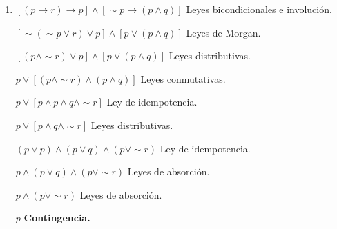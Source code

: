 \documentclass[12pt]{article}
\begin{document}
\begin{enumerate}[start=5]
            \item {\large $[(p \longrightarrow r) \longrightarrow p] \wedge [\sim p \longrightarrow (p \wedge q)]$} {\footnotesize Leyes bicondicionales e involución.}
                \par$[\sim (\sim p \vee r) \vee p] \wedge [ p \vee (p \wedge q)]$ {\footnotesize Leyes de Morgan.}
                \par$[( p \wedge \sim r) \vee p] \wedge [ p \vee (p \wedge q)]$ {\footnotesize Leyes distributivas.}
                \par$p \vee [(p \wedge \sim r) \wedge ( p \wedge q)]$ {\footnotesize Leyes conmutativas.} 
                \par$p \vee [p \wedge p \wedge q \wedge \sim r]$ {\footnotesize Ley de idempotencia.}
                \par$p \vee [p \wedge q \wedge \sim r]$ {\footnotesize Leyes distributivas.}
                \par$(p \vee p) \wedge (p \vee q) \wedge (p \vee \sim r)$ {\footnotesize Ley de idempotencia.}
                \par$p \wedge (p \vee q) \wedge (p \vee \sim r)$ {\footnotesize Leyes de absorción.}
                \par$p \wedge (p \vee \sim r)$ {\footnotesize Leyes de absorción.}
                \par$p$ \textbf{\footnotesize Contingencia.}

        \end{enumerate}
\end{document}

